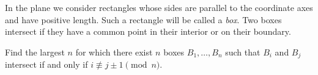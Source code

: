 In the plane we consider rectangles whose sides are parallel to the coordinate axes and have positive length. Such a rectangle will be called a \emph{box}. Two boxes intersect if they have a common point in their interior or on their boundary.

Find the largest $n$ for which there exist $n$ boxes $B_1, \ldots, B_n$ such that $B_i$ and $B_j$ intersect if and only if $i \not\equiv j \pm 1 \pmod{n}$.

